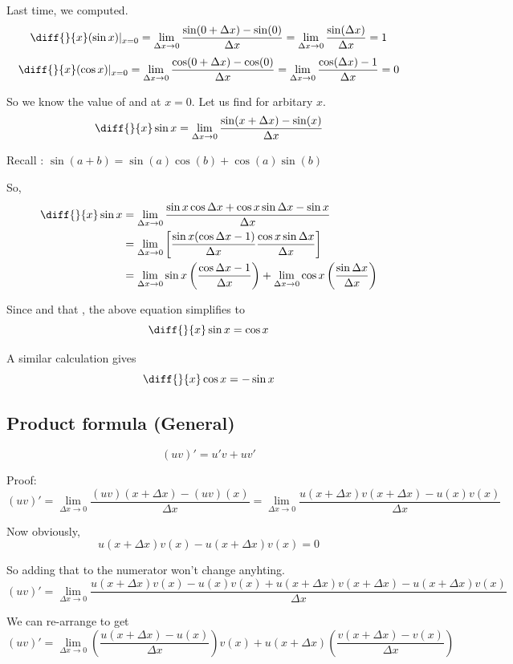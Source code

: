 Last time, we computed.
\[
	\diff{}{x} (\sin x) |_{\substack{x=0}}
		= \lim_{\Delta x \to 0} \frac{\sin(0 + \Delta x) - \sin(0) }{\Delta x}
		= \lim_{\Delta x \to 0} \frac{\sin(\Delta x)}{\Delta x} = 1
\]
\[
	\diff{}{x} (\cos x) |_{\substack{x=0}}
		= \lim_{\Delta x \to 0} \frac{\cos(0 + \Delta x) - \cos(0) }{\Delta x}
		= \lim_{\Delta x \to 0} \frac{\cos(\Delta x)-1}{\Delta x} = 0
\]


So we know the value of  and  at $x = 0$. Let us find for arbitary $x$.
$$\diff{}{x} \sin x = \lim_{\Delta x \to 0} \frac{\sin(x+\Delta x) - \sin(x)}{\Delta x}$$

Recall : $\sin(a+b) = \sin(a)\cos(b) + \cos(a)\sin(b)$

So,
\begin{align*}
	\diff{}{x} \sin x
		& = \lim_{\Delta x \to 0} \frac{\sin x \cos \Delta x + \cos x \sin \Delta x - \sin x}{\Delta x} \\
		& = \lim_{\Delta x \to 0} \left[ \frac{\sin x (\cos \Delta x - 1)}{\Delta x} \frac{\cos x \sin \Delta x}{\Delta x} \right] \\
		& = \lim_{\Delta x \to 0} \sin x \left( \frac{\cos \Delta x - 1}{\Delta x} \right) + \lim_{\Delta x \to 0} \cos x \left( \frac{\sin \Delta x}{\Delta x} \right)
\end{align*}

Since  and that , the above equation simplifies to $$\diff{}{x} \sin x = \cos x$$

A similar calculation gives
$$\diff{}{x} \cos x = - \sin x$$


\subsection{Product formula (General)}

$$(uv)' = u'v+uv'$$

Proof:
$$(uv)' = \lim_{\Delta x \to 0} \frac{(uv)(x+\Delta x) - (uv)(x)}{\Delta x}
		= \lim_{\Delta x \to 0} \frac{u(x+\Delta x)v(x+\Delta x) - u(x)v(x)}{\Delta x}$$

Now obviously, $$u(x+\Delta x)v(x) - u(x+\Delta x)v(x) = 0$$

So adding that to the numerator won't change anyhting.
$$
(uv)' = \lim_{\Delta x \to 0}
	\frac{
		u(x+\Delta x)v(x)
		- u(x)v(x)
		+ u(x+\Delta x)v(x+\Delta x)
		- u(x+\Delta x)v(x)
	}{\Delta x}
$$

We can re-arrange to get
$$
(uv)' = \lim_{\Delta x \to 0}
	\left( \frac{u(x+\Delta x) - u(x)}{\Delta x} \right) v(x) +
	u(x+\Delta x) \left( \frac{v(x+\Delta x) - v(x)}{\Delta x} \right)
$$

